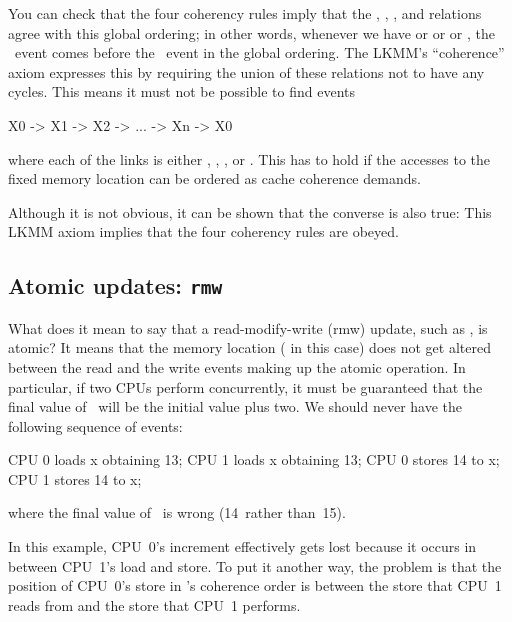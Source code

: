 You can check that the four coherency rules imply that the , , ,
and  relations agree with this global ordering; in other words,
whenever we have  or  or  or , the
~event comes before the ~event in the global ordering.
The LKMM's ``coherence'' axiom expresses this by requiring the union of these
relations not to have any cycles.
This means it must not be possible to find events

\begin{VerbatimU}
	X0 -> X1 -> X2 -> ... -> Xn -> X0
\end{VerbatimU}

\noindent%
where each of the links is either , , , or .
This has to hold if the accesses to the fixed memory location can be
ordered as cache coherence demands.

Although it is not obvious, it can be shown that the converse is also
true:
This LKMM axiom implies that the four coherency rules are obeyed.


\subsection{Atomic updates: \texttt{rmw}}
\label{sec:docs:explanation:Atomic updates: rmw}

What does it mean to say that a read-modify-write (rmw) update, such
as , is atomic?
It means that the memory location ( in this case) does not get
altered between the read and the write events making up the atomic
operation.
In particular, if two CPUs perform  concurrently,
it must be guaranteed that the final value of~ will be the
initial value plus two.
We should never have the following sequence of events:

\begin{VerbatimU}
	CPU 0 loads x obtaining 13;
	                                CPU 1 loads x obtaining 13;
	CPU 0 stores 14 to x;
	                                CPU 1 stores 14 to x;
\end{VerbatimU}

\noindent%
where the final value of~ is wrong (14~rather than~15).

In this example, CPU~0's increment effectively gets lost because it
occurs in between CPU~1's load and store.
To put it another way, the problem is that the position of CPU~0's
store in 's coherence order is between the store that CPU~1
reads from and the store that CPU~1 performs.

